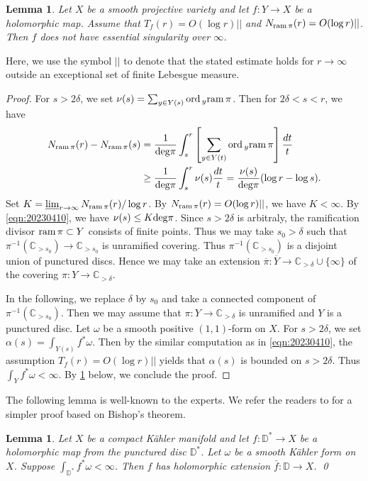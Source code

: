 \documentclass[11pt,english]{smfart}
\theoremstyle{plain}
\newtheorem{lem}[thm]{Lemma}
\theoremstyle{definition}
\theoremstyle{remark}
\numberwithin{equation}{section}
\theoremstyle{plain}
\newcommand{\ord}{{\rm ord}\,}
\newcommand{\ram}{{\rm ram}\,}
\begin{document}
	
	
	
	\begin{lem}\label{lem:20230411}
		Let $X$ be a smooth projective variety and let $f:Y\to X$ be a holomorphic map.
		Assume that $T_f(r)=O(\log r)||$ and $N_{\ram\pi}(r)=O(\log r)||$. 
		Then $f$ does not have essential singularity over $\infty$.
	\end{lem}
	
	Here, we use the symbol $||$ to denote that the stated estimate holds for $r\to\infty$  outside an exceptional set of finite Lebesgue measure.
	
	
	\begin{proof}
		For $s>2\delta$, we set $\nu(s)=\sum_{y\in {Y}(s)} \ord_y \ram \pi$.
		Then for $2\delta <s<r$, we have
		\begin{equation}\label{eqn:20230410}
			\begin{split}
				N_{{\rm ram}\,  \pi}(r)-N_{{\rm ram}\,  \pi}(s)
				&=\frac{1}{{\rm deg} \pi}\int_{s}^{r}\left[\sum_{y\in {Y}(t)} \ord_y \ram \pi \right]\frac{dt}{t}
				\\
				&\geq \frac{1}{{\rm deg} \pi}\int_{s}^{r}\nu(s)\frac{dt}{t}=\frac{\nu(s)}{{\rm deg} \pi}(\log r-\log s).
			\end{split}
		\end{equation}
		Set $K=\varliminf_{r\to\infty}N_{\ram\pi}(r)/\log r$.
		By $N_{\ram\pi}(r)=O(\log r)||$, we have $K<\infty$.
		By \eqref{eqn:20230410}, we have $\nu(s)\leq K{\rm deg} \pi$.
		Since $s>2\delta$ is arbitraly, the ramification divisor $\ram\pi\subset Y$ consists of finite points.
		Thus we may take $s_0>\delta$ such that $\pi^{-1}(\mathbb C_{>s_0})\to \mathbb C_{>s_0}$ is unramified covering.
		Thus $\pi^{-1}(\mathbb C_{>s_0})$ is a disjoint union of punctured discs.
		Hence we may take an extension $\overline{\pi}:\overline{Y}\to \mathbb C_{>\delta}\cup\{\infty\}$ of the covering $\pi:Y\to \mathbb C_{>\delta}$.
		
		In the following, we replace $\delta$ by $s_0$ and take a connected component of $\pi^{-1}(\mathbb C_{>s_0})$.
		Then we may assume that $\pi:Y\to \mathbb C_{>\delta}$ is unramified and $Y$ is a punctured disc.
		Let $\omega$ be a smooth positive $(1,1)$-form on $X$.
		For $s>2\delta$, we set $\alpha(s)=\int_{Y(s)}f^*\omega$.
		Then by the similar computation as in \eqref{eqn:20230410}, the assumption $T_f(r)=O(\log r)||$ yields that $\alpha(s)$ is bounded on $s>2\delta$.
		Thus $\int_Yf^*\omega<\infty$.
		By \cref{lem:picard} below, we conclude the proof.
	\end{proof}
	The following lemma is well-known to the experts. We refer the readers to \cite[Lemma 3.3]{CD21} for a simpler proof based on Bishop's theorem. 
	\begin{lem}\label{lem:picard}
		Let $X$ be a compact K\"ahler manifold and let $f:\mathbb D^*\to X$ be a holomorphic map from the punctured disc $\mathbb D^*$.
		Let $\omega$ be a smooth K\"ahler form on $X$.
		Suppose $\int_{\mathbb D^*}f^*\omega<\infty$.
		Then $f$ has holomorphic extension $\bar{f}:\mathbb D\to X$. \qed
	\end{lem}
	
\end{document}
